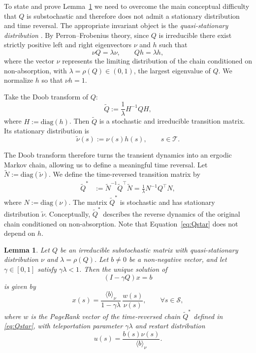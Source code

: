 \documentclass[letterpaper, 10 pt, conference]{ieeeconf}
\renewcommand{\S}{\mathcal{S}}
\newcommand{\T}{\mathcal{T}}
\newtheorem{lemma}{Lemma}
\newcommand{\KAcom}[1]{\textcolor{red}{#1}}
\begin{document}
To state and prove Lemma~\ref{lemma:trans} we need to overcome the main conceptual difficulty that $Q$ is substochastic and therefore does not admit a stationary distribution and time reversal.
The appropriate invariant object is the \emph{quasi-stationary distribution} \cite{seneta1966quasi}.
By Perron--Frobenius theory, since $Q$ is irreducible there exist strictly positive
left and right eigenvectors $\nu$ and $h$ such that
$$
\nu Q = \lambda \nu,
\qquad
Q h = \lambda h,
$$
where the vector $\nu$ represents the limiting distribution of the chain conditioned on
non-absorption, with $\lambda = \rho(Q) \in (0,1)$, the largest eigenvalue of $Q$. We normalize $h$ so that $\nu h = 1$.


Take the Doob transform \cite{Doob1957} \cite[Section~17.6]{levin2017markov} of $Q$:
\begin{equation}
\label{eq:doob}
\widetilde Q := \frac{1}{\lambda} H^{-1} Q H,
\end{equation}
where $H := \mathrm{diag}(h)$.
Then $\widetilde Q$ is a stochastic and irreducible transition matrix.
Its stationary distribution is
$$
\widetilde\nu(s) := \nu(s) h(s), \qquad s \in \T.
$$

The Doob transform therefore turns the transient dynamics into an ergodic Markov
chain, allowing us to define a meaningful time reversal.
Let $\widetilde N := \mathrm{diag}(\widetilde\nu)$.
We define the time-reversed transition matrix by
\begin{align}
\widetilde Q^*
&:= \widetilde N^{-1} \widetilde Q^\top \widetilde N = \frac{1}{\lambda} N^{-1} Q^\top N,
\label{eq:Qstar}
\end{align}
where $N := \mathrm{diag}(\nu)$.
The matrix $\widetilde Q^*$ is stochastic and has stationary distribution $\widetilde\nu$.
Conceptually, $\widetilde Q^*$ describes the reverse dynamics of the original chain
conditioned on non-absorption. Note that Equation~\eqref{eq:Qstar} does not depend on $h$.

\begin{lemma}
\label{lemma:trans}
Let $Q$ be an irreducible substochastic matrix with quasi-stationary
distribution $\nu$ and $\lambda=\rho(Q)$.
Let $b\neq 0$ be a non-negative vector, and let
$\gamma\in[0,1]$ satisfy $\gamma\lambda<1$.
Then the unique solution of
$$
(I-\gamma Q)x=b
$$
is given by
$$
x(s)=\frac{\langle b\rangle_\nu}{1-\gamma\lambda}\,\frac{w(s)}{\nu(s)}, \qquad \forall s \in \S,
$$
where $w$ is the PageRank vector of the time-reversed chain $\widetilde Q^*$ defined in
\eqref{eq:Qstar}, with teleportation parameter $\gamma\lambda$ and restart distribution
$$
u(s)=\frac{b(s)\nu(s)}{\langle b\rangle_\nu}.
$$
\end{lemma}
\end{document}

